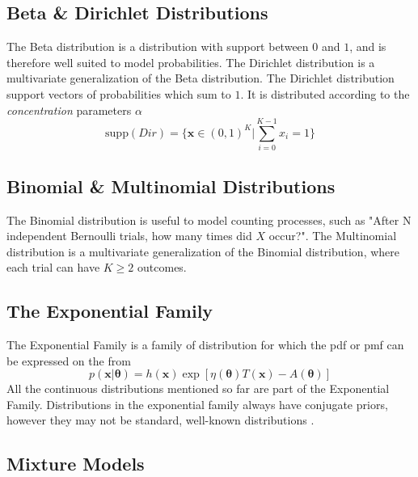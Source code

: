 \subsection{Beta \& Dirichlet Distributions}
The Beta distribution is a distribution with support between $0$ and $1$, and is therefore well suited to model probabilities. The Dirichlet distribution is a multivariate generalization of the Beta distribution. The Dirichlet distribution support vectors of probabilities which sum to $1$. It is distributed according to the \textit{concentration} parameters $\alpha$
\begin{equation}
    \text{supp}(Dir) = \{\boldsymbol{x} \in (0, 1)^K | \sum_{i=0}^{K-1} x_i = 1\} 
\end{equation} 
\subsection{Binomial \& Multinomial Distributions}
The Binomial distribution is useful to model counting processes, such as "After N independent Bernoulli trials, how many times did $X$ occur?". The Multinomial distribution is a multivariate generalization of the Binomial distribution, where each trial can have $K \geq 2$ outcomes. 


\subsection{The Exponential Family}
The Exponential Family is a family of distribution for which the \acrshort{pdf} or \acrshort{pmf} can be expressed on the from
\begin{equation}
    p(\mathbf{x} | \boldsymbol{\theta}) = h(\mathbf{x}) \exp[\eta(\boldsymbol{\theta}) T(\mathbf{x}) - A(\boldsymbol{\theta})]
\end{equation}
All the continuous distributions mentioned so far are part of the Exponential Family. Distributions in the exponential family always have conjugate priors, however they may not be standard, well-known distributions \cite{murphy}. 

\subsection{Mixture Models}


